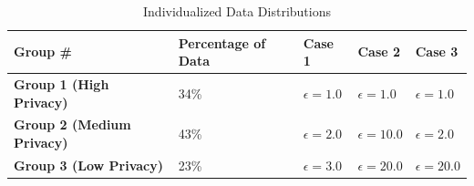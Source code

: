 \begin{table}[!htp]\centering
\caption{Individualized Data Distributions}\label{tab: distrib}
\scriptsize
\begin{tabular}{|p{1.7cm}|p{1.7cm}|p{1.7cm}|p{1.7cm}|p{1.7cm}|}\toprule
\hline
\textbf{Group \#} &\textbf{Percentage of Data} &\textbf{Case 1}&\textbf{Case 2}&\textbf{Case 3}\\\midrule
\hline
\textbf{Group 1 (High Privacy)} &34\% &$\epsilon = 1.0$ &$\epsilon = 1.0$&$\epsilon = 1.0$\\
\hline
\textbf{Group 2 (Medium Privacy)} &43\% &$\epsilon = 2.0$&$\epsilon = 10.0$&$\epsilon = 2.0$ \\
\hline
\textbf{Group 3 (Low Privacy)} &23\% &$\epsilon = 3.0$ &$\epsilon = 20.0$&$\epsilon = 20.0$\\
\hline
\bottomrule
\end{tabular}
\end{table}


